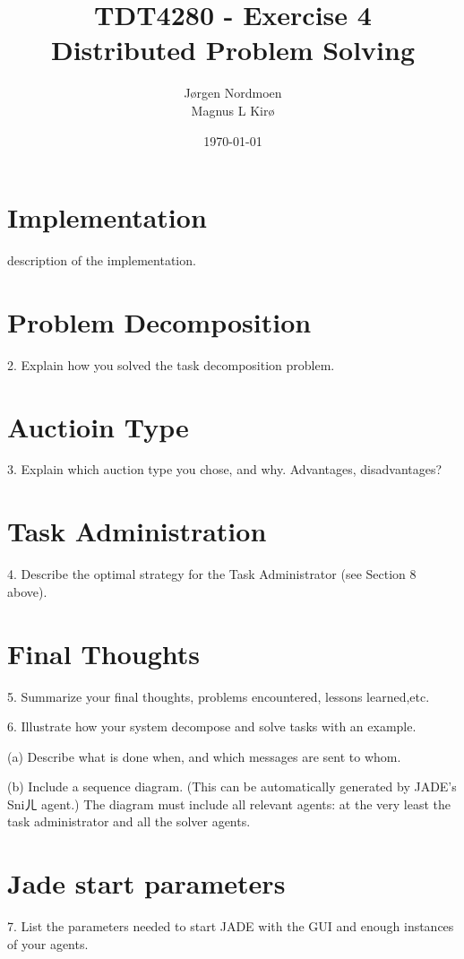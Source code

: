 \documentclass[12pt, a4paper]{article}
\title{
TDT4280 - Exercise 4 \\
Distributed Problem Solving
}
\author{
		Jørgen Nordmoen \\
        Magnus L Kirø \\
}
\date{\today}
\begin{document}
\maketitle
{}

\section{Implementation}
description of the implementation. 

\section{Problem Decomposition}
2. Explain how you solved the task decomposition problem.

\section{Auctioin Type}
3. Explain which auction type you chose, and why. Advantages, disadvantages?

\section{Task Administration}
4. Describe the optimal strategy for the Task Administrator (see Section 8 above).

\section{Final Thoughts}
5. Summarize your final thoughts, problems encountered, lessons learned,etc.

6. Illustrate how your system decompose and solve tasks with an example.

(a) Describe what is done when, and which messages are sent to whom.

(b) Include a sequence diagram. (This can be automatically generated by JADE's Sniㄦ agent.) 
The diagram must include all relevant agents: at the very least the task administrator and all the solver agents.

\section{Jade start parameters}
7. List the parameters needed to start JADE with the GUI and enough instances of your agents.
\end{document}
